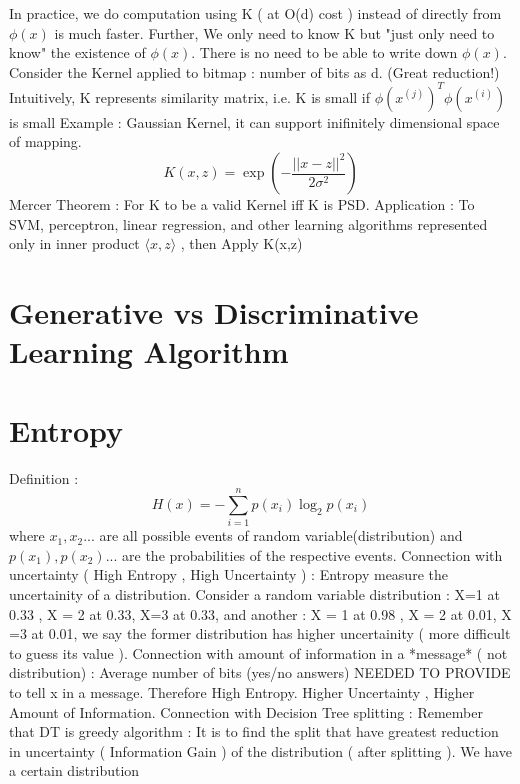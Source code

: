 \documentclass{article}
\begin{document}
In practice, we do computation using K ( at O(d) cost ) instead of directly from \(\phi(x)\) is much faster. Further, We only need to know K but "just only need to know" the existence of \(\phi(x)\). There is no need to be able to write down \(\phi(x)\). Consider the Kernel applied to bitmap : number of bits as d. (Great reduction!)
\newline  
Intuitively, K represents similarity matrix, i.e. K is small if \( \phi(x^{(j)})^T \phi(x^{(i)})\) is small
\newline
Example : Gaussian Kernel, it can support inifinitely dimensional space of mapping.
\[K(x, z) = \exp\left(-\frac{||x - z||^2}{2\sigma^2}\right)\]
\newline 
Mercer Theorem : For K to be a valid Kernel iff K is PSD.
\newline 
Application : To SVM, perceptron, linear regression, and other learning algorithms represented only in inner product \(\langle x,z\rangle\) , then Apply K(x,z)  
\section{Generative vs Discriminative Learning Algorithm} 
\section{Entropy} 
Definition : 
\[H(x) = -\sum_{i=1}^{n} p(x_i) \log_2 p(x_i)\] 
where \(x_1, x_2...\) are all possible events of random variable(distribution) and   \(p(x_1), p(x_2)...\) are the probabilities of the respective events.
\newline
\newline
Connection with uncertainty ( High Entropy , High Uncertainty ) :
\newline
\newline
Entropy measure the uncertainity of a distribution. Consider a random variable distribution :  X=1 at 0.33 , X = 2 at 0.33, X=3 at 0.33, and another : X = 1  at 0.98 , X = 2 at 0.01, X =3 at 0.01, we say the former distribution has higher uncertainity ( more difficult to guess its value ). 
\newline
\newline
Connection with amount of information in a *message* ( not distribution) :
\newline
\newline
Average number of bits (yes/no answers) NEEDED TO PROVIDE to tell x in a message. Therefore High Entropy. Higher Uncertainty , Higher Amount of Information. 
\newline
\newline
Connection with Decision Tree splitting : 
\newline
\newline
Remember that DT is greedy algorithm : It is to find the split that have greatest reduction in uncertainty ( Information Gain ) of the distribution ( after splitting ). We have a certain distribution 
\end{document}
